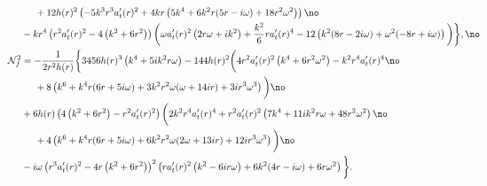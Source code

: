 \documentclass[preprintnumbers,aps,prd,longbibliography,nofootinbib,nobibnotes,amsmath,amssymb]{revtex4}
\begin{document}
\begin{align}
	&+12 h(r)^2 \left(-5 k^3 r^3 a_t'(r)^2+4 k r  \left(5 k^4+6 k^2 r (5 r-i \omega )+18 r^2 \omega ^2\right)\right)\no\\
	&\hspace{-0.5cm}-k r^4 \left(r^2 a_t'(r)^2-4 \left(k^2+6 r^2\right)\right) \bigg( \omega  a_t'(r)^2 \left(2 r \omega +i k^2\right)+\frac{k^2}{6} r a_t'(r)^4-12 \left(k^2 (8 r-2 i \omega )+\omega ^2 (-8 r+i \omega )\right)\bigg)\bigg\},\no\\
	&\hspace{-1cm}\mathcal{N}_f^2  = -\frac{1}{2 r^2 h(r)}\bigg\{3456 h(r)^3 \left(k^4+5 i k^2 r \omega \right) -144 h(r)^2 \bigg(4 r^2 a_t'(r)^2 \left(k^4+6 r^2 \omega ^2\right)-k^2 r^4 a_t'(r)^4\no\\
	&+8 \left(k^6+k^4 r (6 r+5 i \omega )+3 k^2 r^2 \omega  (\omega +14 i r)+3 i r^3 \omega ^3\right)\bigg)\no\\
	&\hspace{-0.5cm}+6 h(r) \left(4 \left(k^2+6 r^2\right)-r^2 a_t'(r)^2\right) \bigg(2 k^2 r^4 a_t'(r)^4+r^2 a_t'(r)^2 \left(7 k^4+11 i k^2 r \omega +48 r^2 \omega ^2\right)\no\\
	&+4 \left(k^6+k^4 r (6 r+5 i \omega )+6 k^2 r^2 \omega  (2 \omega +13 i r)+12 i r^3 \omega ^3\right)\bigg)\no\\
	&\hspace{-0.5cm}-i \omega  \left(r^3 a_t'(r)^2-4 r \left(k^2+6 r^2\right)\right)^2 \left(r a_t'(r)^2 \left(k^2-6 i r \omega \right)+6 k^2 (4 r-i \omega )+6 r \omega ^2\right)\bigg\}.
\end{align}
\end{document}
